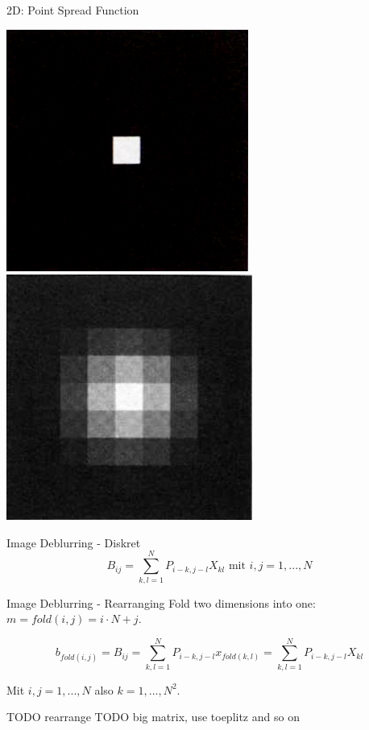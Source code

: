 \documentclass[11pt]{beamer}
\begin{document}
\begin{frame}{2D: Point Spread Function}
\begin{center}
\includegraphics[scale=0.5]{psf_pre}
\mbox{}
\mbox{}
\includegraphics[scale=0.491]{psf_post}
\end{center}
\end{frame}



\begin{frame}{Image Deblurring - Diskret}
\[
B_{ij} = \sum\limits_{k, l = 1}^N P_{i-k,j-l} X_{kl}
\mbox{ mit } i, j = 1, ..., N
\]
\end{frame}


\begin{frame}{Image Deblurring - Rearranging}
Fold two dimensions into one: $m = fold(i, j) = i \cdot N + j$.

\[
b_{fold(i, j)} = B_{ij} = \sum\limits_{k, l = 1}^N P_{i-k,j-l} x_{fold(k, l)} = \sum\limits_{k, l = 1}^N P_{i-k,j-l} X_{kl}
\]

Mit $i, j = 1, ..., N$ also $k = 1, ..., N^2$.

TODO rearrange
TODO big matrix, use toeplitz and so on
\end{frame}
\end{document}
